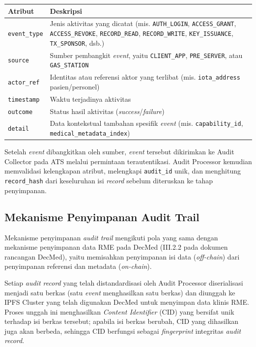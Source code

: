 \begin{xltabular}{\textwidth}{|>{\centering\arraybackslash}p{2.8cm}|X|}
    \hline
    \textbf{Atribut} & \textbf{Deskripsi} \\
    \hline
    \texttt{event\_type} & Jenis aktivitas yang dicatat (mis. \texttt{AUTH\_LOGIN},
    \texttt{ACCESS\_GRANT}, \texttt{ACCESS\_REVOKE}, \texttt{RECORD\_READ},
    \texttt{RECORD\_WRITE}, \texttt{KEY\_ISSUANCE}, \texttt{TX\_SPONSOR}, dsb.) \\
    \hline
    \texttt{source} & Sumber pembangkit \textit{event}, yaitu \texttt{CLIENT\_APP},
    \texttt{PRE\_SERVER}, atau \texttt{GAS\_STATION} \\
    \hline
    \texttt{actor\_ref} & Identitas atau referensi aktor yang terlibat (mis.
    \texttt{iota\_address} pasien/personel) \\
    \hline
    \texttt{timestamp} & Waktu terjadinya aktivitas \\
    \hline
    \texttt{outcome} & Status hasil aktivitas (\textit{success}/\textit{failure}) \\
    \hline
    \texttt{detail} & Data kontekstual tambahan spesifik \textit{event}
    (mis. \texttt{capability\_id}, \texttt{medical\_metadata\_index}) \\
    \hline
\end{xltabular}

Setelah \textit{event} dibangkitkan oleh sumber, \textit{event} tersebut
dikirimkan ke Audit Collector pada ATS melalui permintaan terautentikasi.
Audit Processor kemudian memvalidasi kelengkapan atribut, melengkapi
\texttt{audit\_id} unik, dan menghitung \texttt{record\_hash} dari
keseluruhan isi \textit{record} sebelum diteruskan ke tahap penyimpanan.

\subsection{Mekanisme Penyimpanan Audit Trail}

Mekanisme penyimpanan \textit{audit trail} mengikuti pola yang sama dengan
mekanisme penyimpanan data RME pada DecMed (III.2.2 pada dokumen rancangan
DecMed), yaitu memisahkan penyimpanan isi data (\textit{off-chain}) dari
penyimpanan referensi dan metadata (\textit{on-chain}).

Setiap \textit{audit record} yang telah distandardisasi oleh Audit Processor
diserialisasi menjadi satu berkas (satu \textit{event} menghasilkan satu
berkas) dan diunggah ke IPFS Cluster yang telah digunakan DecMed untuk
menyimpan data klinis RME. Proses unggah ini menghasilkan \textit{Content
Identifier} (CID) yang bersifat unik terhadap isi berkas tersebut; apabila
isi berkas berubah, CID yang dihasilkan juga akan berbeda, sehingga CID
berfungsi sebagai \textit{fingerprint} integritas \textit{audit record}.

